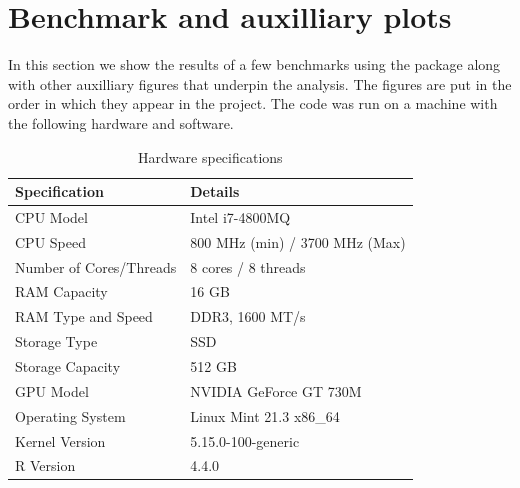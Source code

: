 \section{Benchmark and auxilliary plots}\label{section:benchmark}
In this section we show the results of a few benchmarks using the  package \cite{microbenchmark} along with other auxilliary figures that underpin the analysis. The figures are put in the order in which they appear in the project. The code was run on a machine with the following hardware and software.
\begin{table}[ht]
    \centering
    \begin{tabular}{@{}ll@{}}
    \toprule
    Specification      & Details                              \\ \midrule
    CPU Model          & Intel i7-4800MQ                 \\
    CPU Speed          & 800 MHz (min) / 3700 MHz (Max)     \\
    Number of Cores/Threads & 8 cores / 8 threads              \\
    RAM Capacity       & 16 GB                                \\
    RAM Type and Speed & DDR3, 1600 MT/s                      \\
    Storage Type       & SSD                                  \\
    Storage Capacity   & 512 GB                               \\
    GPU Model          & NVIDIA GeForce GT 730M              \\
    Operating System   & Linux Mint 21.3 x86\_64                   \\
    Kernel Version     & 5.15.0-100-generic                    \\
    R Version          & 4.4.0                                \\
    \bottomrule
    \end{tabular}
    \caption{Hardware specifications}
    \label{tab:specs}
    \end{table}

